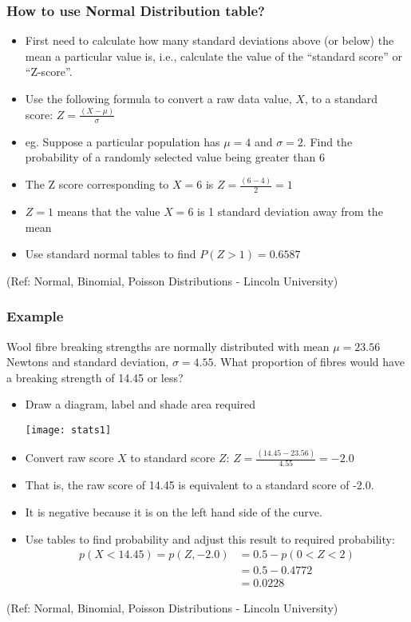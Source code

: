 \begin{frame}
\frametitle{How to use Normal Distribution table?}

\begin{itemize}
\item First need to calculate how many standard deviations above (or below) the mean a
particular value is, i.e., calculate the value of the ``standard score'' or ``Z-score''.
\item Use the following formula to convert a raw data value, $X$, to a standard score:
$Z = \frac{(X - \mu)}{\sigma}$
\item eg. Suppose a particular population has $\mu= 4$ and $\sigma = 2$. Find the probability of a
randomly selected value being greater than 6
\item The Z score corresponding to $X = 6$ is $Z = \frac{(6 - 4)}{2} = 1$
\item $Z=1$ means that the value $X = 6$ is 1 standard deviation away from the mean
\item Use  standard normal tables to find $P(Z>1) = 0.6587$
\end{itemize}


{\tiny (Ref: Normal, Binomial, Poisson Distributions -  Lincoln University)}
\end{frame}

\begin{frame}
\frametitle{Example}
Wool fibre breaking strengths are normally distributed with mean $\mu = 23.56$ Newtons
and standard deviation, $\sigma = 4.55$.
What proportion of fibres would have a breaking strength of 14.45 or less? 
\begin{itemize}
\item Draw a diagram, label and shade area required

\begin{center}
\texttt{[image: stats1]}
\end{center}

\item Convert raw score $X$ to standard score $Z$: $Z = \frac{(14.45 - 23.56)}{4.55} = - 2.0$
\item That is, the raw score of 14.45 is equivalent to a standard score of -2.0.
\item It is negative because it is on the left hand side of the curve.
\item Use tables to find probability and adjust this result to required probability: 
\begin{align*}
p(X < 14.45) = p(Z ,-2.0) &= 0.5 - p(0< Z < 2)\\
&= 0.5 - 0.4772\\
&=0.0228
\end{align*}
\end{itemize}


{\tiny (Ref: Normal, Binomial, Poisson Distributions -  Lincoln University)}
\end{frame}


